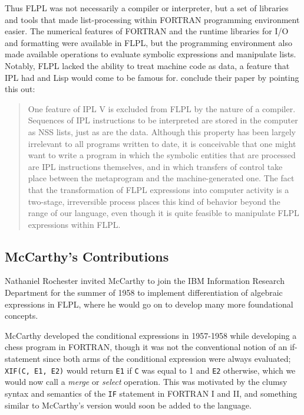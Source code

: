 Thus FLPL was not necessarily a compiler or interpreter, but a set of libraries and tools
that made list-processing within FORTRAN programming environment easier.
The numerical features of FORTRAN and the runtime libraries for I/O and formatting
were available in FLPL, but the programming environment also made available operations
to evaluate symbolic expressions and manipulate lists.
Notably, FLPL lacked the ability to treat machine code as data, a feature that IPL had
and Lisp would come to be famous for.
\citeauthor{gelernter_flpl_1960} conclude their paper by pointing this out:

\begin{quotation}
	One feature of IPL V is excluded from FLPL by the nature of a compiler.
	Sequences of IPL instructions to be interpreted are stored in the computer as
	NSS lists, just as are the data. Although this property has been largely irrelevant
	to all programs written to date, it is conceivable that one might want to write
	a program in which the symbolic entities that are processed are IPL instructions
	themselves, and in which transfers of control take place between the metaprogram and
	the machine-generated one. The fact that the transformation of
	FLPL expressions into computer activity is a two-stage, irreversible process
	places this kind of behavior beyond the range of our language, even though it is
	quite feasible to manipulate FLPL expressions within FLPL.
\end{quotation}

\subsection{McCarthy's Contributions}

Nathaniel Rochester invited McCarthy to join the IBM Information Research Department for the
summer of 1958 to implement differentiation of algebraic expressions in FLPL,
where he would go on to develop many more foundational concepts.

McCarthy developed the conditional expressions in 1957-1958 while developing a chess program
in FORTRAN, though it was not the conventional notion of an if-statement since both arms
of the conditional expression were always evaluated; \texttt{XIF(C, E1, E2)} would return
\texttt{E1} if \texttt{C} was equal to 1 and \texttt{E2} otherwise, which we would now call
a \textit{merge} or \textit{select} operation.
This was motivated by the clumsy syntax and semantics of the \texttt{IF} statement in FORTRAN I and II,
and something similar to McCarthy's version would soon be added to the language.



